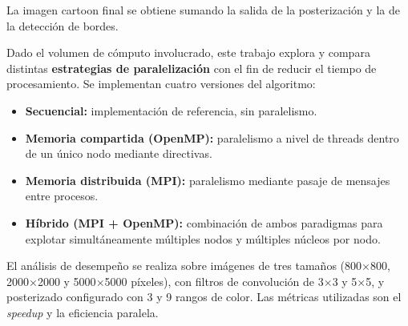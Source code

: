 La imagen cartoon final se obtiene sumando la salida de la posterización y la de la detección
de bordes.
 
Dado el volumen de cómputo involucrado, este trabajo explora y compara distintas \textbf{estrategias de
paralelización} con el fin de reducir el tiempo de procesamiento. Se implementan cuatro
versiones del algoritmo:
 
\begin{itemize}
  \item \textbf{Secuencial:} implementación de referencia, sin paralelismo.
  \item \textbf{Memoria compartida (OpenMP):} paralelismo a nivel de threads dentro de un
        único nodo mediante directivas.
  \item \textbf{Memoria distribuida (MPI):} paralelismo mediante pasaje de mensajes entre
        procesos.
  \item \textbf{Híbrido (MPI + OpenMP):} combinación de ambos paradigmas para explotar
        simultáneamente múltiples nodos y múltiples núcleos por nodo.
\end{itemize}
 
El análisis de desempeño se realiza sobre imágenes de tres tamaños
(800$\times$800, 2000$\times$2000 y 5000$\times$5000 píxeles), con filtros de convolución
de 3$\times$3 y 5$\times$5, y posterizado configurado con 3 y 9 rangos de color. Las métricas
utilizadas son el \textit{speedup} y la eficiencia paralela.